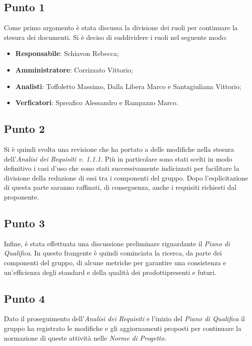     \subsection{Punto 1}
        Come primo argomento è stata discussa la divisione dei ruoli per continuare la stesura dei documenti. Si è deciso di suddividere i ruoli nel seguente modo:
        \begin{itemize}
            \item \textbf{Responsabile}: Schiavon Rebecca;
            \item \textbf{Amministratore}: Corrizzato Vittorio;
            \item \textbf{Analisti}: Toffoletto Massimo, Dalla Libera Marco e Santagiuliana Vittorio;
            \item \textbf{Verficatori}: Spreafico Alessandro e Rampazzo Marco. 
        \end{itemize}
    \subsection{Punto 2}
        Si è quindi svolta una revisione che ha portato a delle modifiche nella stesura dell'\textit{Analisi dei Requisiti v. 1.1.1}. Più in particolare sono stati scelti in modo definitivo i casi d'uso che sono stati successivamente indicizzati per facilitare la divisione della redazione di essi tra i componenti del gruppo. Dopo l'esplicitazione di questa parte saranno raffinati, di conseguenza, anche i requisiti richiesti dal proponente.
    \subsection{Punto 3}
        Infine, è stata effettuata una discussione preliminare riguardante il \textit{Piano di Qualifica}. In questo frangente è quindi cominciata la ricerca, da parte dei componenti del gruppo, di alcune metriche per garantire una consistenza e un'efficienza degli standard e della qualità dei prodotti\glosp presenti e futuri.
    \subsection{Punto 4}
        Dato il proseguimento dell'\textit{Analisi dei Requisiti} e l'inizio del \textit{Piano di Qualifica} il gruppo ha registrato le modifiche e gli aggiornamenti proposti per continuare la normazione di queste attività nelle \textit{Norme di Progetto}.